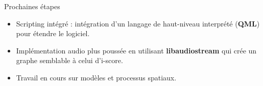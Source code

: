 \begin{block}{Prochaines étapes}
    \begin{itemize}
        \item Scripting intégré : intégration d'un langage de haut-niveau interprété (\textbf{QML}) pour étendre le logiciel.
        \item Implémentation audio plus poussée en utilisant \textbf{libaudiostream}\cite{letz_specification_2014} qui crée un graphe semblable à celui d'i-score.
        \item Travail en cours sur modèles et processus spatiaux.
    \end{itemize}
\end{block}